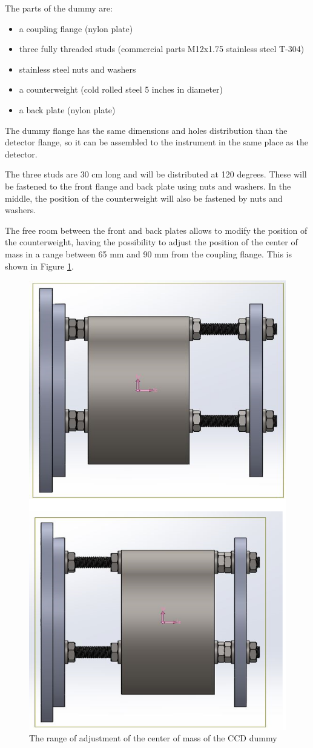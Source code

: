 \documentclass{report}
\begin{document}
The parts of the dummy are: 
\begin{itemize}
    \item a coupling flange (nylon plate) 
    \item three fully threaded studs (commercial parts M12x1.75 stainless steel T-304)
    \item stainless steel nuts and washers
    \item a counterweight (cold rolled steel 5 inches in diameter)
    \item a back plate (nylon plate)
\end{itemize}

The dummy flange has the same dimensions and holes distribution than the detector flange, so it can be assembled to the instrument in the same place as the detector.

The three studs are 30 cm long and will be distributed at 120 degrees. These will be fastened to the front flange and back plate using nuts and washers. In the middle, the position of the counterweight will also be fastened by nuts and washers.

The free room between the front and back plates allows to modify the position of the counterweight, having the possibility to adjust the position of the center of mass in a range between 65 mm and 90 mm from the coupling flange. This is shown in Figure \ref{figure:ccd-dummy-adjustment}.

\begin{figure}
    \centering
    \includegraphics[width=0.7\linewidth]{figures/CCD-dummy-range.png}
    \caption{The range of adjustment of the center of mass of the CCD dummy}
    \label{figure:ccd-dummy-adjustment}
\end{figure}
\end{document}
